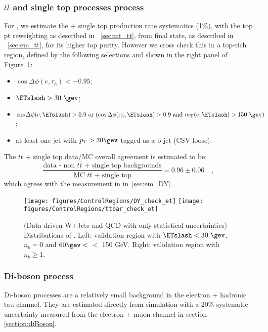 \subsubsection{$t\bar{t}$ and single top processes process}
For \teth, we estimate the \ttbar + single top production rate
systematics (1\%), with the top pt reweighting as described in 
~\ref{sec:mt_tt}, from \tetm final state, as described in
 ~\ref{sec:em_tt}, for its higher top purity.  However 
we cross check this in a \teth top-rich region, defined by 
the following selections and shown in the right panel of 
Figure~\ref{fig:et_dy_tt}:
\begin{itemize}
  \item $\cos{\Delta \phi (e,\tau_{h})}<-0.95$;
  \item $\ETslash>30~\gev$;
  \item $\cos{\Delta \phi (e,\ETslash)} > 0.9~\text{or}~(\cos{\Delta \phi (\tau_{h},\ETslash)} > 0.9~\text{and}~m_{\text{T}}(e,\ETslash) > 150~\gev)$;
  \item at least one jet with $p_T>30\gev$ tagged as a b-jet (CSV loose).
\end{itemize}
The $t\bar{t}$ + single top data/MC overall agreement is estimated to be:
\begin{equation}\label{eq:et_tt}
\frac{\text{data - non $t\bar{t}$ + single top backgrounds}}{\text{MC $t\bar{t}$ + single top}}  =  0.96 \pm 0.06 \quad,
\end{equation}
which agrees with the measurement in in~\ref{sec:em_DY}. 

\begin{figure}\centering
  \texttt{[image: figures/ControlRegions/DY\_check\_et]}
  \texttt{[image: figures/ControlRegions/ttbar\_check\_et]}
  \caption{\label{fig:et_dy_tt}(Data driven W+Jets and QCD with only statistical uncertainties) Distributions of \meffetau. Left:
    validation region with $\ETslash<30~\gev$, $n_b = 0$ and $60 \gev<$  \meffetau $<$ 150 GeV.  Right:
    validation region with $n_b\geq1$.}
\end{figure}

\subsubsection{Di-boson process}
Di-boson processes are a relatively small background in the electron + 
hadronic tau channel. They are estimated directly from simulation with 
a 20\% systematic uncertainty measured from the electron + muon channel 
in section \ref{section:diBoson}.
    
